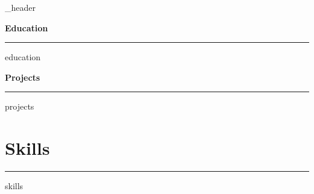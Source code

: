 \documentclass[letter,10pt]{article}
\author{\textbf{Youzhi Wang}} %
\begin{document}
{_header}



    \textbf{\Large Education} 
\vspace{3pt}
\hrule
\vspace{3pt}
{education}
\vspace*{7pt}






    \textbf{\Large Projects}

\hrule

\vspace*{3pt}
{projects}
\vspace*{7pt}



\section{\textbf{Skills}}
\vspace{0.5}

\hrule

\vspace*{7pt}
{skills}
\vspace*{7pt}

\begin{comment}

\section{Certifications}
{certifications}
\vspace*{7pt}
\end{comment}

\begin{comment}
\section{Publications}
{publications}
\vspace*{7pt}
\end{comment}

\end{document}
